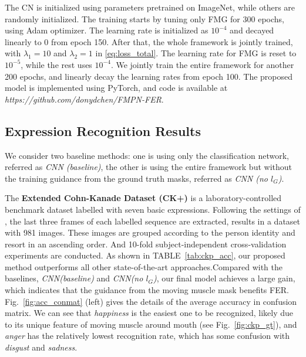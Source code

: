 \documentclass[conference,a4paper]{IEEEtran}
\begin{document}
The CN is initialized using parameters pretrained on ImageNet, while others are randomly initialized. The training starts by tuning only FMG for 300 epochs, using Adam optimizer. The learning rate is initialized as $10^{-4}$ and decayed linearly to 0 from epoch 150. After that, the whole framework is jointly trained, with $\lambda_1 = 10$ and $\lambda_2 = 1$ in \eqref{eq:loss_total}. The learning rate for FMG is reset to $10^{-5}$, while the rest uses $10^{-4}$. We jointly train the entire framework for another 200 epochs, and linearly decay the learning rates from epoch 100. The proposed model is implemented using PyTorch, and code is available at 
\textit{https://github.com/donydchen/FMPN-FER}.







\subsection{Expression Recognition Results}
We consider two baseline methods: one is using only the classification network, referred as \textit{CNN (baseline)}, the other is using the entire framework but without the training guidance from the ground truth masks, referred as \textit{CNN (no $l_G$)}. 



The \textbf{Extended Cohn-Kanade Dataset (CK+)} \cite{lucey2010extended} is a laboratory-controlled benchmark dataset labelled with seven basic expressions. Following the settings of \cite{yang2018facial}, the last three frames of each labelled sequence are extracted, results in a dataset with 981 images. These images are grouped according to the person identity and resort in an ascending order. And 10-fold subject-independent cross-validation experiments are conducted.
As shown in TABLE~\ref{tab:ckp_acc}, our proposed method outperforms all other state-of-the-art approaches.Compared with the baselines, \textit{CNN(baseline)} and \textit{CNN(no $l_G$)}, our final model achieves a large gain, which indicates that the guidance from the moving muscle mask benefits FER. Fig.~\ref{fig:acc_conmat} (left) gives the details of the average accuracy in confusion matrix. We can see that \textit{happiness} is the easiest one to be recognized, likely due to its unique feature of moving muscle around mouth (see Fig.~\ref{fig:ckp_gt}), and \textit{anger} has the relatively lowest recognition rate, which has some confusion with \textit{disgust} and \textit{sadness}.
\end{document}
